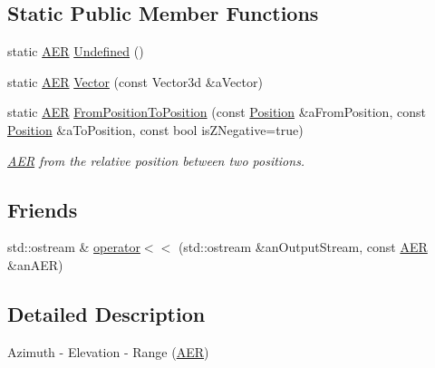 \subsection*{Static Public Member Functions}
\begin{DoxyCompactItemize}
\item 
static \hyperlink{classostk_1_1physics_1_1coord_1_1spherical_1_1_a_e_r}{A\+ER} \hyperlink{classostk_1_1physics_1_1coord_1_1spherical_1_1_a_e_r_a5046e91d1757a8f94e212d621e5c48b9}{Undefined} ()
\item 
static \hyperlink{classostk_1_1physics_1_1coord_1_1spherical_1_1_a_e_r}{A\+ER} \hyperlink{classostk_1_1physics_1_1coord_1_1spherical_1_1_a_e_r_a9d843e5e09faec5bfdd0b333b5380778}{Vector} (const Vector3d \&a\+Vector)
\item 
static \hyperlink{classostk_1_1physics_1_1coord_1_1spherical_1_1_a_e_r}{A\+ER} \hyperlink{classostk_1_1physics_1_1coord_1_1spherical_1_1_a_e_r_a4c264ba73c632ebe259a127575024c87}{From\+Position\+To\+Position} (const \hyperlink{classostk_1_1physics_1_1coord_1_1_position}{Position} \&a\+From\+Position, const \hyperlink{classostk_1_1physics_1_1coord_1_1_position}{Position} \&a\+To\+Position, const bool is\+Z\+Negative=true)
\begin{DoxyCompactList}\small\item\em \hyperlink{classostk_1_1physics_1_1coord_1_1spherical_1_1_a_e_r}{A\+ER} from the relative position between two positions. \end{DoxyCompactList}\end{DoxyCompactItemize}
\subsection*{Friends}
\begin{DoxyCompactItemize}
\item 
std\+::ostream \& \hyperlink{classostk_1_1physics_1_1coord_1_1spherical_1_1_a_e_r_ac5514fc65bf0bd3f4f5870b246cff3ad}{operator$<$$<$} (std\+::ostream \&an\+Output\+Stream, const \hyperlink{classostk_1_1physics_1_1coord_1_1spherical_1_1_a_e_r}{A\+ER} \&an\+A\+ER)
\end{DoxyCompactItemize}


\subsection{Detailed Description}
Azimuth -\/ Elevation -\/ Range (\hyperlink{classostk_1_1physics_1_1coord_1_1spherical_1_1_a_e_r}{A\+ER}) 

